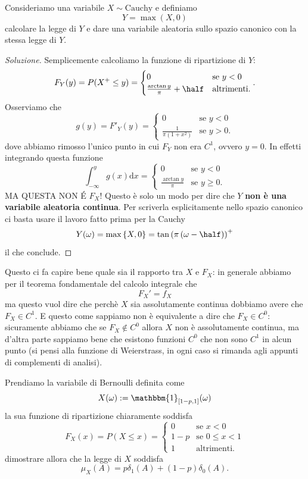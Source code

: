 \documentclass[11pt]{scrartcl}
\newcommand{\dif}{\text{d}}
\begin{document}
	\begin{example}
		Consideriamo una variabile $X\sim \text{Cauchy}$ e definiamo
		$$Y=\max(X,0)$$
		calcolare la legge di $Y$ e dare una variabile aleatoria sullo spazio canonico con la stessa legge di $Y$.
	\end{example}
	\begin{proof}[Soluzione]
		Semplicemente calcoliamo la funzione di ripartizione di $Y$:
		$$F_Y(y)=P(X^+\le y)=\begin{cases}
			0 & \text{se $y< 0$} \\
			\frac{\arctan y}{\pi}+\half & \text{altrimenti.}
		\end{cases}.$$
		Osserviamo che 
		$$g(y)=F'_Y(y)=\begin{cases}
			0 &\text{se $y<0$} \\
			\frac{1}{\pi(1+x^2)} & \text{se $y>0$.}
		\end{cases}$$
		dove abbiamo rimosso l'unico punto in cui $F_Y$ non era $C^1$, ovvero $y=0$. In effetti integrando questa funzione
		$$\int_{-\infty}^y g(x)\dif x=\begin{cases}
			0 & \text{se $y<0$} \\
			\frac{\arctan y}{\pi} & \text{se $y\ge 0$}.
		\end{cases}$$
		MA QUESTA NON \'E $F_X$! Questo è solo un modo per dire che $Y$ \textbf{non è una variabile aleatoria continua}. Per scriverla esplicitamente nello spazio canonico ci basta usare il lavoro fatto prima per la Cauchy
		$$Y(\omega)=\max\left\{X,0\right\}=\tan\left(\pi\left(\omega-\half\right)\right)^+$$
		il che conclude. 
	\end{proof}
	Questo ci fa capire bene quale sia il rapporto tra $X$ e $F_X$: in generale abbiamo per il teorema fondamentale del calcolo integrale che
	$$F_X'=f_X$$ 
	ma questo vuol dire che perchè $X$ sia assolutamente continua dobbiamo avere che $F_X\in C^1$. E questo come sappiamo non è equivalente a dire che $F_X\in C^0$: sicuramente abbiamo che se $F_X\not\in C^0$ allora $X$ non è assolutamente continua, ma d'altra parte sappiamo bene che esistono funzioni $C^0$ che non sono $C^1$ in alcun punto (si pensi alla funzione di Weierstrass, in ogni caso si rimanda agli appunti di complementi di analisi).
	\begin{example}[Bernoulli]
		Prendiamo la variabile di Bernoulli definita come
		$$X(\omega):=\mathbbm{1}_{[1-p,1]}(\omega)$$
		la sua funzione di ripartizione chiaramente soddisfa
		$$F_X(x)=P(X\le x)=\begin{cases}
			0 & \text{se $x<0$} \\
			1-p & \text{se $0\le x<1$} \\
			1 & \text{altrimenti.}
		\end{cases}$$
		dimostrare allora che la legge di $X$ soddisfa
		$$\mu_X(A)=p\delta_1(A)+(1-p)\delta_0(A).$$
	\end{example}
\end{document}
